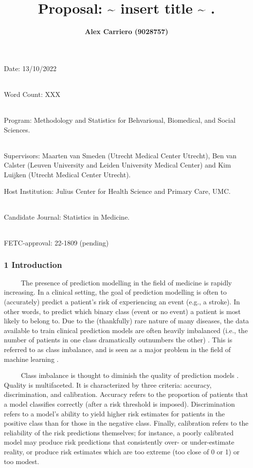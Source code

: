 \documentclass[
  11pt,
]{article}
\title{\textbf{Proposal: \textasciitilde{} insert title
\textasciitilde{} .}}
\author{\textbf{Alex Carriero (9028757) \vspace{4in}}}
\date{}
\begin{document}
\maketitle

Date: 13/10/2022\\
\strut \\
Word Count: XXX\\
\strut \\
Program: Methodology and Statistics for Behvarioual, Biomedical, and
Social Sciences.\\
\strut \\
Supervisors: Maarten van Smeden (Utrecht Medical Center Utrecht), Ben
van Calster (Leuven University and Leiden University Medical Center) and
Kim Luijken (Utrecht Medical Center Utrecht).

Host Institution: Julius Center for Health Science and Primary Care,
UMC.\\
\strut \\
Candidate Journal: Statistics in Medicine.\\
\strut \\
FETC-approval: 22-1809 (pending)

\newpage

\hypertarget{introduction}{%
\subsubsection{1 \textbar{} Introduction}\label{introduction}}

~~~~~The presence of prediction modelling in the field of medicine is
rapidly increasing. In a clinical setting, the goal of prediction
modelling is often to (accurately) predict a patient's risk of
experiencing an event (e.g., a stroke). In other words, to predict which
binary class (event or no event) a patient is most likely to belong to.
Due to the (thankfully) rare nature of many diseases, the data available
to train clinical prediction models are often heavily imbalanced (i.e.,
the number of patients in one class dramatically outnumbers the other)
\autocite{summary_m}. This is referred to as class imbalance, and is
seen as a major problem in the field of machine learning
\autocite{summary_m}.

~~~~~Class imbalance is thought to diminish the quality of prediction
models \autocite{yu}. Quality is multifaceted. It is characterized by
three criteria: accuracy, discrimination, and calibration. Accuracy
refers to the proportion of patients that a model classifies correctly
(after a risk threshold is imposed). Discrimination refers to a model's
ability to yield higher risk estimates for patients in the positive
class than for those in the negative class. Finally, calibration refers
to the reliability of the risk predictions themselves; for instance, a
poorly calibrated model may produce risk predictions that consistently
over- or under-estimate reality, or produce risk estimates which are too
extreme (too close of 0 or 1) or too modest.
\end{document}
